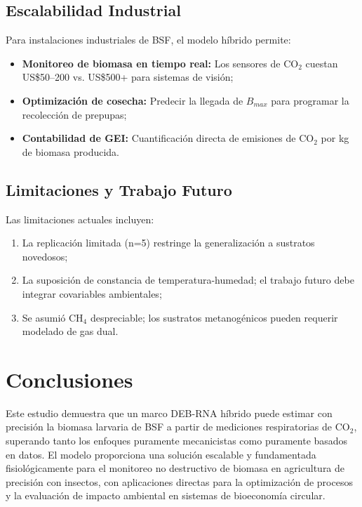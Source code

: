 \documentclass[12pt,a4paper]{article}
\begin{document}
\subsection{Escalabilidad Industrial}

Para instalaciones industriales de BSF, el modelo h\'{i}brido permite:
\begin{itemize}
    \item \textbf{Monitoreo de biomasa en tiempo real:} Los sensores de CO$_2$ cuestan US\$50--200 vs. US\$500+ para sistemas de visi\'{o}n;
    \item \textbf{Optimizaci\'{o}n de cosecha:} Predecir la llegada de $B_{max}$ para programar la recolecci\'{o}n de prepupas;
    \item \textbf{Contabilidad de GEI:} Cuantificaci\'{o}n directa de emisiones de CO$_2$ por kg de biomasa producida.
\end{itemize}

\subsection{Limitaciones y Trabajo Futuro}

Las limitaciones actuales incluyen:
\begin{enumerate}
    \item La replicaci\'{o}n limitada (n=5) restringe la generalizaci\'{o}n a sustratos novedosos;
    \item La suposici\'{o}n de constancia de temperatura-humedad; el trabajo futuro debe integrar covariables ambientales;
    \item Se asumi\'{o} CH$_4$ despreciable; los sustratos metanog\'{e}nicos pueden requerir modelado de gas dual.
\end{enumerate}

\section{Conclusiones}

Este estudio demuestra que un marco DEB-RNA h\'{i}brido puede estimar con precisi\'{o}n la biomasa larvaria de BSF a partir de mediciones respiratorias de CO$_2$, superando tanto los enfoques puramente mecanicistas como puramente basados en datos. El modelo proporciona una soluci\'{o}n escalable y fundamentada fisiol\'{o}gicamente para el monitoreo no destructivo de biomasa en agricultura de precisi\'{o}n con insectos, con aplicaciones directas para la optimizaci\'{o}n de procesos y la evaluaci\'{o}n de impacto ambiental en sistemas de bioeconom\'{i}a circular.
\end{document}
